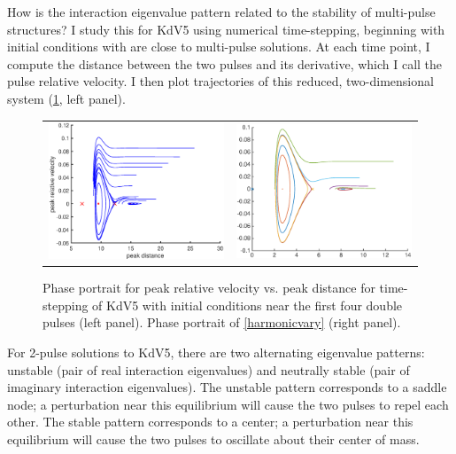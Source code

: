 \documentclass[12pt,reqno,oneside]{article}
\theoremstyle{definition}
\theoremstyle{remark}
\begin{document}
How is the interaction eigenvalue pattern related to the stability of multi-pulse structures? I study this for KdV5 using numerical time-stepping, beginning with initial conditions with are close to multi-pulse solutions. At each time point, I compute the distance between the two pulses and its derivative, which I call the pulse relative velocity. I then plot trajectories of this reduced, two-dimensional system (\cref{fig:KdV5timestep}, left panel). 
\begin{figure}[H]
\begin{tabular}{cc}
\includegraphics[width=7cm]{images/phaseportrait}  &
\includegraphics[width=7cm]{images/simplephaseportrait}
\end{tabular}
\caption{Phase portrait for peak relative velocity vs. peak distance for time-stepping of KdV5 with initial conditions near the first four double pulses (left panel). Phase portrait of \cref{harmonicvary} (right panel).
}
\label{fig:KdV5timestep}
\end{figure}
For 2-pulse solutions to KdV5, there are two alternating eigenvalue patterns: unstable (pair of real interaction eigenvalues) and neutrally stable (pair of imaginary interaction eigenvalues). The unstable pattern corresponds to a saddle node; a perturbation near this equilibrium will cause the two pulses to repel each other. The stable pattern corresponds to a center; a perturbation near this equilibrium will cause the two pulses to oscillate about their center of mass. 
\end{document}
